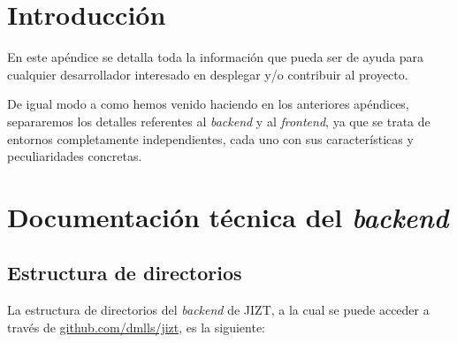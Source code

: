 
\section{Introducción}

En este apéndice se detalla toda la información que pueda ser de ayuda para cualquier desarrollador interesado en desplegar y/o contribuir al proyecto.

De igual modo a como hemos venido haciendo en los anteriores apéndices, separaremos los detalles referentes al \emph{backend} y al \emph{frontend}, ya que se trata de entornos completamente independientes, cada uno con sus características y peculiaridades concretas.

\section{Documentación técnica del \emph{backend}}


\subsection{Estructura de directorios}

La estructura de directorios del \emph{backend} de JIZT, a la cual se puede acceder a través de \href{https://github.com/dmlls/jizt}{github.com/dmlls/jizt}, es la siguiente:

